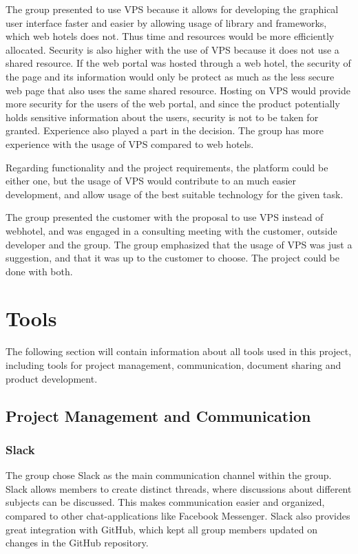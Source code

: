 The group presented to use VPS because it allows for developing the graphical user interface faster and easier by allowing usage of library and frameworks, which web hotels does not.  Thus time and resources would be more efficiently allocated. Security is also higher with the use of VPS because it does not use a shared resource. If the web portal was hosted through a web hotel, the security of the page and its information would only be protect as much as the less secure web page that also uses the same shared resource. Hosting on VPS would provide more security for the users of the web portal, and since the product potentially holds sensitive information about the users, security is not to be taken for granted.  Experience also played a part in the decision. The group has more experience with the usage of VPS compared to web hotels. 

Regarding functionality and the project requirements, the platform could be either one, but the usage of VPS would contribute to an much easier development, and allow usage of the best suitable technology for the given task. 

The group presented the customer with the proposal to use VPS instead of webhotel, and was engaged in a consulting meeting with the customer, outside developer and the group. The group emphasized that the usage of VPS was just a suggestion, and that it was up to the customer to choose. The project could be done with both.


\section{Tools}
\label{tools}
The following section will contain information about all tools used in this project, including tools for project management, communication, document sharing and product development.

\subsection{Project Management and Communication}

\subsubsection{Slack}
The group chose Slack \cite{Slack} as the main communication channel within the group. Slack allows members to create distinct threads, where discussions about different subjects can be discussed. This makes communication easier and organized, compared to other chat-applications like Facebook Messenger. Slack also provides great integration with GitHub, which kept all group members updated on changes in the GitHub repository. 

